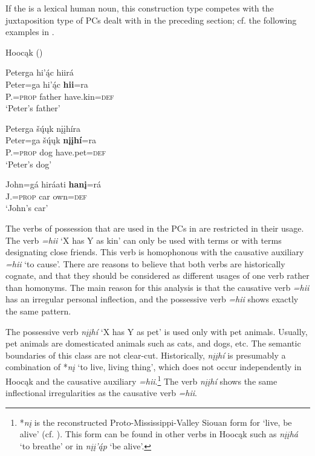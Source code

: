 \documentclass[output=paper]{LSP/langsci}
\begin{document}
If the  is a lexical human noun, this construction type competes with the juxtaposition type of PCs dealt with in the preceding section; cf. the following examples in .
 
\ea {}Hoocąk (\citealt[16]{Helmbrecht2003}) \label{petersthings}

\ea 
\glll Peterga hi'ą́c hiirá \\
Peter=ga        hi'ą́c   \textbf{hii}=ra \\
P.=\textsc{prop}  father have.kin=\textsc{def} \\
\glt `Peter's father'

\ex 
\glll Peterga šų́ųk nįįhíra \\
Peter=ga      šų́ųk   \textbf{nįįhí}=ra \\
P.=\textsc{prop} dog   have.pet=\textsc{def} \\
\glt `Peter's dog'

\ex \gll John=gá      hiráati \textbf{hanį}=rá \\
J.=\textsc{prop} car       own=\textsc{def} \\
\glt `John's car'

\z \z

The verbs of possession that are used in the PCs in  are restricted in their usage. The verb \textit{=hii} `X has Y as kin' can only be used with  terms or with terms designating close friends. This verb is homophonous with the causative auxiliary \textit{=hii} `to cause'. There are reasons to believe that both verbs are historically cognate, and that they should be considered as different usages of one verb rather than homonyms. The main reason for this analysis is that the causative verb \textit{=hii} has an irregular personal inflection, and the possessive verb \textit{=hii} shows exactly the same pattern. 
 
The possessive verb \textit{nįįh\'i} `X has Y as pet' is used only with pet animals. Usually, pet animals are domesticated animals such as cats, and dogs, etc. The semantic boundaries of this class are not clear-cut. Historically, \textit{nįįhí} is presumably a combination of *\textit{nį} `to live, living thing', which does not occur independently in Hoocąk and the causative auxiliary \textit{=hii}.\footnote{*\textit{n\k{i}} is the reconstructed Proto-Mississippi-Valley Siouan form for `live, be alive' (cf. \citealt{RankinEtAl2015AccessMay}). This form can be found in other verbs in Hoocąk such as \textit{n\k{i}\k{i}h\'a} `to breathe'  or in \textit{n\k{i}\k{i}'\'{\k{a}}p} `be alive'.} The verb \textit{nįįhí} shows the same inflectional irregularities as the causative verb \textit{=hii}. 
 
\end{document}
